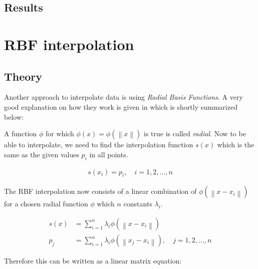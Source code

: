 \subsection{Results}

\section{RBF interpolation}

\subsection{Theory}

Another approach to interpolate data is using \textit{Radial Basis Functions}. A very good explanation on how they work is given in \cite{RBF} which is shortly summarized below:

 A function $\phi$ for which $\phi(x)=\phi(\left\|x\right\|)$ is true is called \textit{radial}. Now to be able to interpolate, we need to find the interpolation function $s(x)$ which is the same as the given values $p_i$ in all points.

\begin{align}
	s(x_i)=p_i,\quad i=1,2,\dots,n
\end{align}

The RBF interpolation now consists of a linear combination of $\phi(\left\|x-x_i\right\|)$ for a chosen radial function $\phi$ which $n$ constants $\lambda_i$.

\begin{align}
	s(x)&=	\sum_{i=1}^{n}\lambda_i\phi(\left\|x-x_i\right\|) \\
	p_j&=\sum_{i=1}^{n}\lambda_i\phi(\left\|x_j-x_i\right\|),\quad j=1,2,\dots,n
\end{align}

Therefore this can be written as a linear matrix equation:

